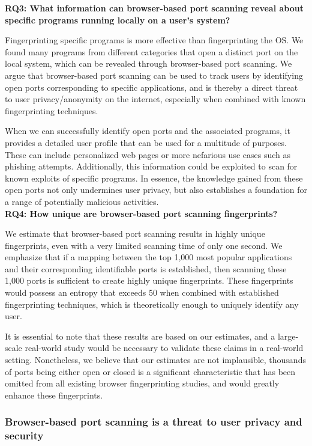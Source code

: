 \textbf{RQ3: What information can browser-based port scanning reveal about specific programs
running locally on a user’s system?}

Fingerprinting specific programs is more effective than fingerprinting the OS. 
We found many programs from different categories that open a distinct port on the local system, which can be revealed through browser-based port scanning. 
We argue that browser-based port scanning can be used to track users by identifying open ports corresponding to specific applications, and is thereby a direct threat to user privacy/anonymity on the internet, especially when combined with known fingerprinting techniques.

When we can successfully identify open ports and the associated programs, it provides a detailed user profile that can be used for a multitude of purposes. 
These can include personalized web pages or more nefarious use cases such as phishing attempts.
Additionally, this information could be exploited to scan for known exploits of specific programs. 
In essence, the knowledge gained from these open ports not only undermines user privacy, but also establishes a foundation for a range of potentially malicious activities.
\\

\textbf{RQ4: How unique are browser-based port scanning fingerprints?}

We estimate that browser-based port scanning results in highly unique fingerprints, even with a very limited scanning time of only one second. We emphasize that if a mapping between the top 1,000 most popular applications and their corresponding identifiable ports is established, then scanning these 1,000 ports is sufficient to create highly unique fingerprints. These fingerprints would possess an entropy that exceeds 50 when combined with established fingerprinting techniques, which is theoretically enough to uniquely identify any user.

It is essential to note that these results are based on our estimates, and a large-scale real-world study would be necessary to validate these claims in a real-world setting. Nonetheless, we believe that our estimates are not implausible, thousands of ports being either open or closed is a significant characteristic that has been omitted from all existing browser fingerprinting studies, and would greatly enhance these fingerprints.


\subsubsection{Browser-based port scanning is a threat to user privacy and security}

